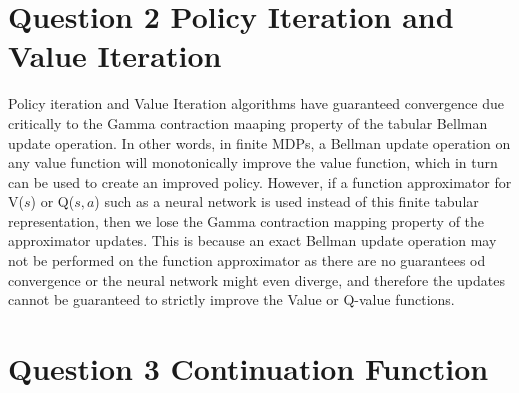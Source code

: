 \documentclass[12pt]{article}
\begin{document}
\newpage
\section*{Question 2 Policy Iteration and Value Iteration}
    \begin{tcolorbox}[fit,height=8cm, width=\textwidth, blank, borderline={1pt}{-2pt},nobeforeafter]
    Policy iteration and Value Iteration algorithms have guaranteed convergence due critically to the Gamma contraction maaping property of the tabular Bellman update operation. In other words, in finite MDPs, a Bellman update operation on any value function will monotonically improve the value function, which in turn can be used to create an improved policy. However, if a function approximator for V($s$) or Q($s,a$) such as a neural network is used instead of this finite tabular representation, then we lose the Gamma contraction mapping property of the approximator updates. This is because an exact Bellman update operation may not be performed on the function approximator as there are no guarantees od convergence or the neural network might even diverge, and therefore the updates cannot be guaranteed to strictly improve the Value or Q-value functions.
    \end{tcolorbox}
\newpage
\section*{Question 3 Continuation Function}
\end{document}
